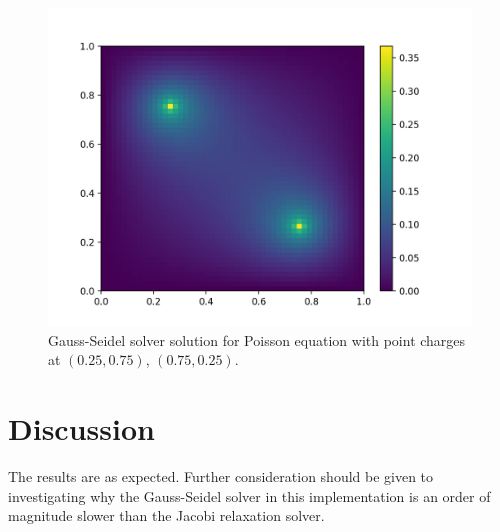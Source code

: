 \documentclass[11pt,a4paper]{article}
\begin{document}
\begin{figure}[ht]
\begin{center}
\includegraphics[scale=1.2]{figure_3.png} 
\end{center}
\caption{Gauss-Seidel solver solution for Poisson equation with point charges at $(0.25, 0.75)$, $(0.75, 0.25)$.}
\label{fig:3}
\end{figure}

\section{Discussion}
The results are as expected. Further consideration should be given to investigating why the Gauss-Seidel solver
in this implementation is an order of magnitude slower than the Jacobi relaxation solver.










\end{document}
